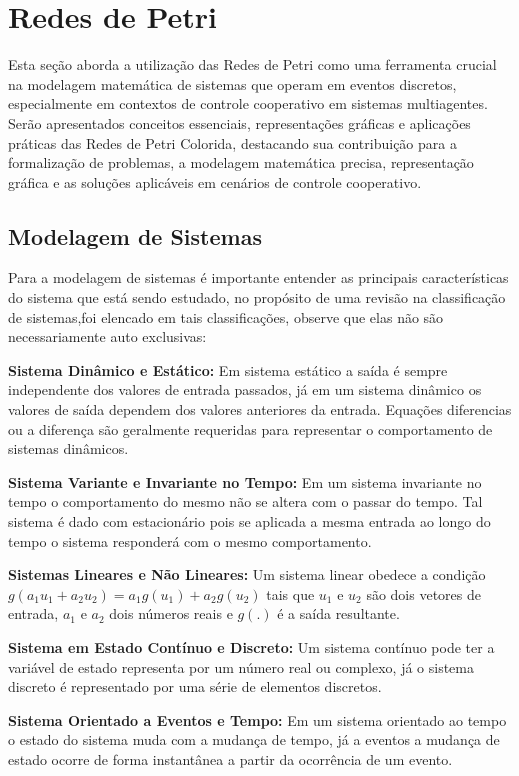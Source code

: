 \chapter{Redes de Petri}
\label{chap:petri}
Esta seção aborda a utilização das Redes de Petri como uma ferramenta crucial na modelagem matemática de sistemas que operam em eventos discretos, especialmente em contextos de controle cooperativo em sistemas multiagentes. Serão apresentados conceitos essenciais, representações gráficas e aplicações práticas das Redes de Petri Colorida, destacando sua contribuição para a formalização de problemas, a modelagem matemática precisa, representação gráfica e as soluções aplicáveis em cenários de controle cooperativo.

\section{Modelagem de Sistemas}
Para a modelagem de sistemas é importante entender as principais características do sistema que está sendo estudado, no propósito de uma revisão na classificação de sistemas,foi elencado em \cite{cassandras} tais classificações, observe que elas não são necessariamente auto exclusivas: 

\textbf{Sistema Dinâmico e Estático:}  Em sistema estático a saída é sempre independente dos valores de entrada passados, já em um sistema dinâmico os valores de saída dependem dos valores anteriores da entrada. Equações diferencias ou a diferença são geralmente requeridas para representar o comportamento de sistemas dinâmicos.

\textbf{Sistema Variante e Invariante no Tempo:} Em um sistema invariante no tempo o comportamento do mesmo não se altera com o passar do tempo. Tal sistema é dado com estacionário pois se aplicada a mesma entrada ao longo do tempo o sistema responderá com o mesmo comportamento.

\textbf{Sistemas Lineares e Não Lineares: } Um sistema linear obedece a condição $g(a_1u_1 + a_2u_2) = a_1g(u_1) + a_2g(u_2)$ tais que $u_1$ e $u_2$ são dois vetores de entrada, $a_1$ e $a_2$ dois números reais e $g(.)$ é a saída resultante. 

\textbf{Sistema em Estado Contínuo e Discreto: } Um sistema contínuo pode ter a variável de estado representa por um número real ou complexo, já o sistema discreto é representado por uma série de elementos discretos.

\textbf{Sistema Orientado a Eventos e Tempo: } Em um sistema orientado ao tempo o estado do sistema muda com a mudança de tempo, já a eventos a mudança de estado ocorre de forma instantânea a partir da ocorrência de um evento.

